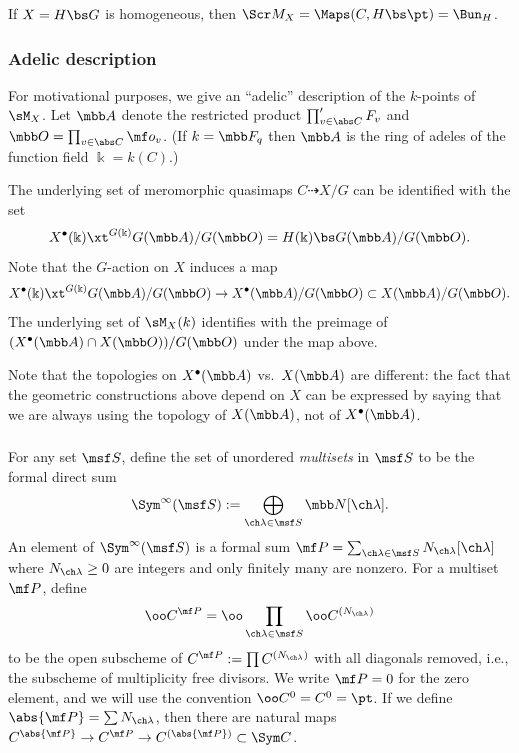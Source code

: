 If $X = H\bs G$ is homogeneous, then $\Scr M_X = \Maps(C,H\bs \pt) = \Bun_H$.

\subsubsection{Adelic description} \label{sect:adelic}
For motivational purposes, we give an ``adelic'' description of the $k$-points of
$\sM_X$.
Let $\mbb A$ denote the restricted product $\prod'_{v\in \abs C} F_v$ and
$\mbb O = \prod_{v\in \abs C} \mf o_v$.
(If $k=\mbb F_q$ then $\mbb A$ is the ring of adeles of the function field $\Bbbk = k(C)$.)

The underlying set of meromorphic quasimaps $C \dashrightarrow X/G$
can be identified with the set
\[ X^\bullet(\Bbbk) \xt^{G(\Bbbk)} G(\mbb A) / G(\mbb O)
= H(\Bbbk) \bs G(\mbb A) / G(\mbb O).
\]
Note that the $G$-action on $X$ induces a map
\[ X^\bullet(\Bbbk) \xt^{G(\Bbbk)} G(\mbb A) / G(\mbb O) \to X^\bullet(\mbb A)/G(\mbb O) \subset X(\mbb A)/G(\mbb O).
\]
The underlying set of $\sM_X(k)$ identifies with
the preimage of $(X^\bullet(\mbb A) \cap X(\mbb O)) / G(\mbb O)$ under the map above.



Note that the topologies on $X^\bullet(\mbb A)$ vs.~$X(\mbb A)$ are different: the
fact that the geometric constructions above depend on $X$ can be expressed
by saying that we are always using the topology of $X(\mbb A)$, not of $X^\bullet(\mbb A)$.



\subsubsection{} \label{def:partition}
For any set $\msf S$, define the set of unordered \emph{multisets} in
$\msf S$ to be the formal direct sum
\[ \Sym^\infty(\msf S) := \bigoplus_{\ch\lambda\in \msf S} \mbb N[\ch\lambda]. \]
An element of $\Sym^\infty(\msf S)$ is a
formal sum $\mf P = \sum_{\ch\lambda \in \msf S} N_{\ch\lambda}[\ch\lambda]$
where $N_{\ch\lambda}\ge 0$ are integers and only finitely many
are nonzero.
For a multiset $\mf P$, define
\[ \oo C^{\mf P} = \oo \prod_{\ch\lambda \in \msf S} \oo C^{(N_{\ch\lambda})}
\]
to be the open subscheme of $C^{\mf P}:=\prod C^{(N_{\ch\lambda})}$
with all diagonals
removed, i.e., the subscheme of multiplicity free divisors.
We write $\mf P=0$ for the zero element, and we will use the
convention $\oo C^{0}=C^{0}=\pt$.
If we define $\abs{\mf P} = \sum N_{\ch\lambda}$, then there are
natural maps $C^{\abs{\mf P}} \to C^{\mf P} \to C^{(\abs{\mf P})} \subset \Sym C$.

